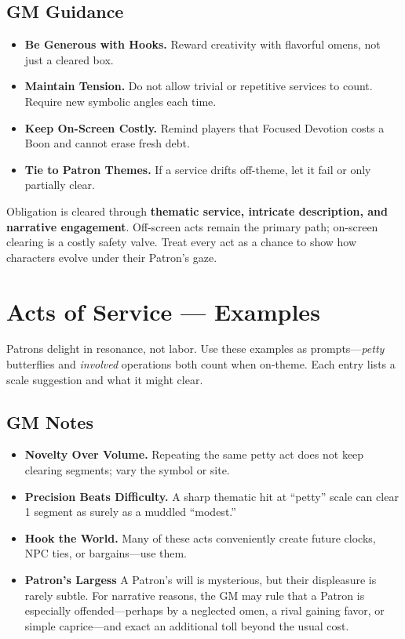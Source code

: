 \subsection{GM Guidance}\label{subsec:obligation-gm}
\begin{itemize}
\item \textbf{Be Generous with Hooks.} Reward creativity with flavorful omens, not just a cleared box.
\item \textbf{Maintain Tension.} Do not allow trivial or repetitive services to count. Require new symbolic angles each time.
\item \textbf{Keep On-Screen Costly.} Remind players that Focused Devotion costs a Boon and cannot erase fresh debt.
\item \textbf{Tie to Patron Themes.} If a service drifts off-theme, let it fail or only partially clear.
\end{itemize}

\begin{tcolorbox}[title={Summary},colback=gray!5,colframe=black]
Obligation is cleared through \textbf{thematic service, intricate description, and narrative engagement}. Off-screen acts remain the primary path; on-screen clearing is a costly safety valve. Treat every act as a chance to show how characters evolve under their Patron’s gaze.
\end{tcolorbox}

\section{Acts of Service — Examples}\label{sec:acts-of-service-table}

Patrons delight in resonance, not labor. Use these examples as prompts---\emph{petty} butterflies and \emph{involved} operations both count when on-theme. Each entry lists a scale suggestion and what it might clear.
  
\subsection*{GM Notes}\label{subsec:acts-service-gm}
\begin{itemize}
\item \textbf{Novelty Over Volume.} Repeating the same petty act does not keep clearing segments; vary the symbol or site.
\item \textbf{Precision Beats Difficulty.} A sharp thematic hit at “petty” scale can clear 1 segment as surely as a muddled “modest.”
\item \textbf{Hook the World.} Many of these acts conveniently create future clocks, NPC ties, or bargains—use them.
\item \textbf{Patron’s Largess} A Patron’s will is mysterious, but their displeasure is rarely subtle. For narrative reasons, the GM may rule that a Patron is especially offended—perhaps by a neglected omen, a rival gaining favor, or simple caprice—and exact an additional toll beyond the usual cost.
\end{itemize}

